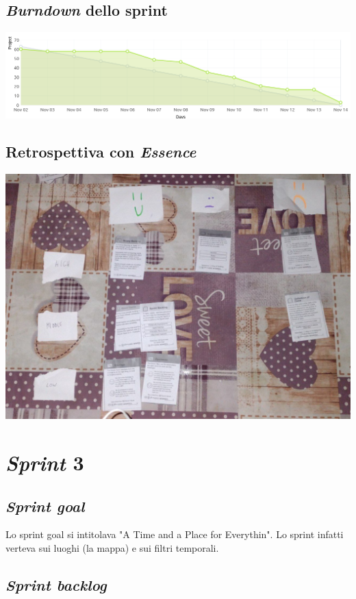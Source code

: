 \documentclass{article}
\begin{document}
\subsection{\emph{Burndown} dello sprint}

\includegraphics[width=\textwidth]{burndown-2.png}

\subsection{Retrospettiva con \emph{Essence}}

\includegraphics[width=\textwidth]{essence-2.jpg}

\section{\emph{Sprint} 3}

\subsection{\emph{Sprint goal}}

Lo sprint goal si intitolava "A Time and a Place for Everythin". Lo sprint
infatti verteva sui luoghi (la mappa) e sui filtri temporali.

\subsection{\emph{Sprint backlog}}
\end{document}
